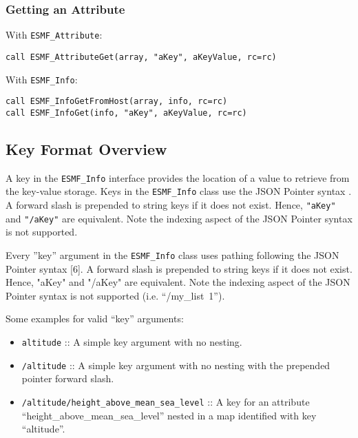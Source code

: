 \subsubsection{Getting an Attribute}
With \texttt{ESMF\_Attribute}:
\begin{verbatim}
call ESMF_AttributeGet(array, "aKey", aKeyValue, rc=rc)
\end{verbatim}
With \texttt{ESMF\_Info}:
\begin{verbatim}
call ESMF_InfoGetFromHost(array, info, rc=rc)
call ESMF_InfoGet(info, "aKey", aKeyValue, rc=rc)
\end{verbatim}

\subsection{Key Format Overview}
\label{info_key_format}
A key in the \texttt{ESMF\_Info} interface provides the location of a value to retrieve from the key-value storage. Keys in the \texttt{ESMF\_Info} class use the JSON Pointer syntax \cite{json_for_modern_cpp_json_pointer}. A forward slash is prepended to string keys if it does not exist. Hence, \texttt{"aKey"} and \texttt{"/aKey"} are equivalent. Note the indexing aspect of the JSON Pointer syntax is not supported.

Every ”key” argument in the \texttt{ESMF\_Info} class uses pathing following the JSON Pointer syntax [6]. A forward slash is prepended to string keys if it does not exist. Hence, "aKey" and "/aKey" are equivalent. Note the indexing aspect of the JSON Pointer syntax is not supported (i.e. “/my\_list~1”).

Some examples for valid “key” arguments:
\begin{itemize}
    \item \texttt{altitude} :: A simple key argument with no nesting.
    \item \texttt{/altitude} :: A simple key argument with no nesting with the prepended pointer forward slash.
    \item \texttt{/altitude/height\_above\_mean\_sea\_level} :: A key for an attribute “height\_above\_mean\_sea\_level” nested in a map identified with key “altitude”.
\end{itemize}